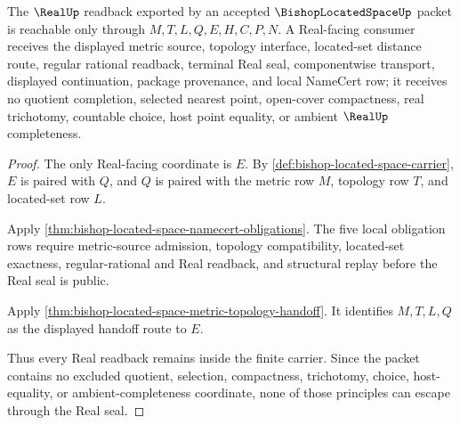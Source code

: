 \begin{theorem}
\label{thm:bishop-located-space-real-readback-nonescape}
The $\RealUp$ readback exported by an accepted $\BishopLocatedSpaceUp$ packet is reachable only through $M,T,L,Q,E,H,C,P,N$. A Real-facing consumer receives the displayed metric source, topology interface, located-set distance route, regular rational readback, terminal Real seal, componentwise transport, displayed continuation, package provenance, and local NameCert row; it receives no quotient completion, selected nearest point, open-cover compactness, real trichotomy, countable choice, host point equality, or ambient $\RealUp$ completeness.
\end{theorem}
\begin{proof}
The only Real-facing coordinate is $E$. By \autoref{def:bishop-located-space-carrier}, $E$ is paired with $Q$, and $Q$ is paired with the metric row $M$, topology row $T$, and located-set row $L$.

Apply \autoref{thm:bishop-located-space-namecert-obligations}. The five local obligation rows require metric-source admission, topology compatibility, located-set exactness, regular-rational and Real readback, and structural replay before the Real seal is public.

Apply \autoref{thm:bishop-located-space-metric-topology-handoff}. It identifies $M,T,L,Q$ as the displayed handoff route to $E$.

Thus every Real readback remains inside the finite carrier. Since the packet contains no excluded quotient, selection, compactness, trichotomy, choice, host-equality, or ambient-completeness coordinate, none of those principles can escape through the Real seal.
\end{proof}



